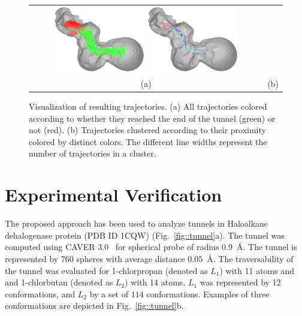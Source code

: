 \documentclass{svmult}
\def\LA{L_1}
\def\LB{L_2}
\begin{document}
\begin{figure}
\centering
\begin{tabular}{cc}
\includegraphics[width=0.4\textwidth]{fig/trajectories-all}
\includegraphics[width=0.4\textwidth]{fig/trajectories-clustered-21} \\
(a) & (b) \\                       
\end{tabular}
\caption{Visualization of resulting trajectories.
(a) All trajectories colored according to whether they reached the end of the tunnel (green) or not (red).
(b) Trajectories clustered according to their proximity colored by distinct colors.
The different line widths represent the number of trajectories in a cluster.
\label{fig:trajectories}
}
\end{figure}




\section{Experimental Verification}

The proposed approach has been used to analyze tunnels in Haloalkane dehalogenase protein (PDB ID 1CQW) (Fig.~\ref{fig::tunnel}a).
The tunnel was computed using CAVER 3.0~\cite{caver3} for spherical probe of radius 0.9~\AA.
The tunnel is represented by 760 spheres with average distance $0.05$~\AA.
The traversability of the tunnel was evaluated for 1-chlorpropan (denoted as $\LA$) with 11 atoms and 
and 1-chlorbutan (denoted as $\LB$) with 14 atoms.
$\LA$ was represented by 12 conformations, and $\LB$ by a set of $114$ conformations.
Examples of three conformations are depicted in Fig.~\ref{fig::tunnel}b.
\end{document}
